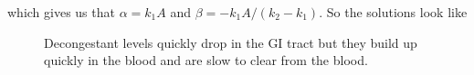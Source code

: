 \documentclass{unswmaths}
\begin{document}
which gives us that $ \alpha = k_1 A $ and $ \beta = -k_1 A / (k_2 - k_1 ) $.
So the solutions look like
\begin{figure}[H]

Decongestant levels quickly drop in the GI tract but they build up quickly in the blood and are slow to clear from the blood.
\end{figure}
\end{document}
